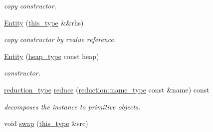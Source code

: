 \begin{DoxyCompactItemize}
\begin{DoxyCompactList}\small\item\em copy constructor. \end{DoxyCompactList}\item 
\hypertarget{classhryky_1_1uri_1_1path_1_1_entity_afabbef1a8bbdb174d10308b258802e64}{\hyperlink{classhryky_1_1uri_1_1path_1_1_entity_afabbef1a8bbdb174d10308b258802e64}{Entity} (\hyperlink{classhryky_1_1uri_1_1path_1_1_entity_ab451cbde937d2551ecd5c3360cb58100}{this\-\_\-type} \&\&rhs)}\label{classhryky_1_1uri_1_1path_1_1_entity_afabbef1a8bbdb174d10308b258802e64}

\begin{DoxyCompactList}\small\item\em copy constructor by rvalue reference. \end{DoxyCompactList}\item 
\hypertarget{classhryky_1_1uri_1_1path_1_1_entity_aa2517cde29bbe11231314f1661f6c0c7}{\hyperlink{classhryky_1_1uri_1_1path_1_1_entity_aa2517cde29bbe11231314f1661f6c0c7}{Entity} (\hyperlink{classhryky_1_1memory_1_1heap_1_1_base}{heap\-\_\-type} const heap)}\label{classhryky_1_1uri_1_1path_1_1_entity_aa2517cde29bbe11231314f1661f6c0c7}

\begin{DoxyCompactList}\small\item\em constructor. \end{DoxyCompactList}\item 
\hypertarget{classhryky_1_1uri_1_1path_1_1_entity_a35c26860dd828001c7a150f304309d85}{\hyperlink{namespacehryky_a343a9a4c36a586be5c2693156200eadc}{reduction\-\_\-type} \hyperlink{classhryky_1_1uri_1_1path_1_1_entity_a35c26860dd828001c7a150f304309d85}{reduce} (\hyperlink{namespacehryky_1_1reduction_ac686c30a4c8d196bbd0f05629a6b921f}{reduction\-::name\-\_\-type} const \&name) const }\label{classhryky_1_1uri_1_1path_1_1_entity_a35c26860dd828001c7a150f304309d85}

\begin{DoxyCompactList}\small\item\em decomposes the instance to primitive objects. \end{DoxyCompactList}\item 
\hypertarget{classhryky_1_1uri_1_1path_1_1_entity_a0ef5da04f8bed4103b3fe0035f14b9fc}{void \hyperlink{classhryky_1_1uri_1_1path_1_1_entity_a0ef5da04f8bed4103b3fe0035f14b9fc}{swap} (\hyperlink{classhryky_1_1uri_1_1path_1_1_entity_ab451cbde937d2551ecd5c3360cb58100}{this\-\_\-type} \&src)}\label{classhryky_1_1uri_1_1path_1_1_entity_a0ef5da04f8bed4103b3fe0035f14b9fc}


\end{DoxyCompactItemize}
